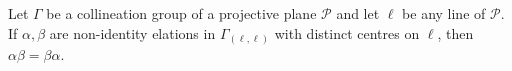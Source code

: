 Let $\Gamma$ be a collineation group of a projective plane $\mathcal{P}$ and let $\ell$ be any line of $\mathcal{P}$. If $\alpha, \beta$ are non-identity elations in $\Gamma_{(\ell,\ell)}$ with distinct centres on $\ell$, then $\alpha\beta = \beta\alpha$.
